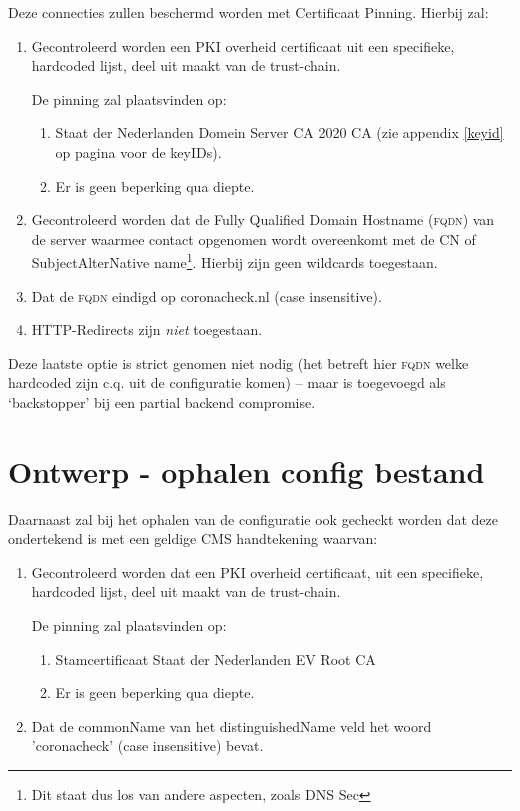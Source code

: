 \documentclass[11.0pt,twoside,openright]{report}
\begin{document}
Deze connecties zullen beschermd worden met Certificaat Pinning. Hierbij zal:

\begin{enumerate}
\item	Gecontroleerd worden een PKI overheid certificaat uit een specifieke, hardcoded lijst, deel uit maakt van de trust-chain.

De pinning zal plaatsvinden op:
\begin{enumerate}
\item Staat der Nederlanden Domein Server CA 2020 CA (zie appendix \ref{keyid} op pagina \pageref{keyid} voor de keyIDs).
\item Er is geen beperking qua diepte.
\end{enumerate}
\item 	Gecontroleerd worden dat de Fully Qualified Domain Hostname (\textsc{fqdn}) van de server waarmee contact opgenomen wordt overeenkomt met de CN of SubjectAlterNative name\footnote{Dit staat dus los van andere aspecten, zoals DNS Sec}. Hierbij zijn geen wildcards toegestaan. 
\item 	Dat de \textsc{fqdn} eindigd op coronacheck.nl (case insensitive).
\item HTTP-Redirects zijn \emph{niet} toegestaan.
\end{enumerate}

Deze laatste optie is strict genomen niet nodig (het betreft hier \textsc{fqdn} welke hardcoded zijn c.q. uit de configuratie komen) -- maar is toegevoegd als `backstopper' bij een partial backend compromise.

\section{Ontwerp - ophalen config bestand}
\label{config}

Daarnaast zal bij het ophalen van de configuratie ook gecheckt worden dat deze ondertekend is met een geldige CMS handtekening waarvan:

\begin{enumerate}
\item	Gecontroleerd worden dat een PKI overheid certificaat, uit een specifieke, hardcoded lijst, deel uit maakt van de trust-chain.

De pinning zal plaatsvinden op:
\begin{enumerate}
\item Stamcertificaat Staat der Nederlanden EV Root CA
\item Er is geen beperking qua diepte.
\end{enumerate}
\item	Dat de commonName van het distinguishedName veld het woord 'coronacheck' (case insensitive) bevat.
\end{enumerate}
\end{document}
